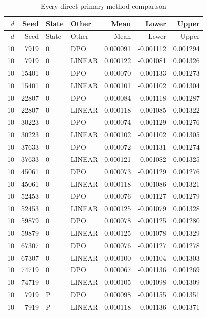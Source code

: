 \begingroup\small\setlength{\tabcolsep}{4pt}
\begin{longtable}{rrllrrr}
\caption{Every direct primary method comparison}\label{tab:r14pairedseeds}\\
\toprule
$d$ & Seed & State & Other & Mean & Lower & Upper\\\midrule
\endfirsthead
\toprule
$d$ & Seed & State & Other & Mean & Lower & Upper\\\midrule
\endhead
10 & 7919 & 0 & DPO & 0.000091 & -0.001112 & 0.001294\\
10 & 7919 & 0 & LINEAR & 0.000122 & -0.001081 & 0.001326\\
10 & 15401 & 0 & DPO & 0.000070 & -0.001133 & 0.001273\\
10 & 15401 & 0 & LINEAR & 0.000101 & -0.001102 & 0.001304\\
10 & 22807 & 0 & DPO & 0.000084 & -0.001118 & 0.001287\\
10 & 22807 & 0 & LINEAR & 0.000118 & -0.001085 & 0.001322\\
10 & 30223 & 0 & DPO & 0.000074 & -0.001129 & 0.001276\\
10 & 30223 & 0 & LINEAR & 0.000102 & -0.001102 & 0.001305\\
10 & 37633 & 0 & DPO & 0.000072 & -0.001131 & 0.001274\\
10 & 37633 & 0 & LINEAR & 0.000121 & -0.001082 & 0.001325\\
10 & 45061 & 0 & DPO & 0.000073 & -0.001129 & 0.001276\\
10 & 45061 & 0 & LINEAR & 0.000118 & -0.001086 & 0.001321\\
10 & 52453 & 0 & DPO & 0.000076 & -0.001127 & 0.001279\\
10 & 52453 & 0 & LINEAR & 0.000125 & -0.001079 & 0.001328\\
10 & 59879 & 0 & DPO & 0.000078 & -0.001125 & 0.001280\\
10 & 59879 & 0 & LINEAR & 0.000125 & -0.001078 & 0.001329\\
10 & 67307 & 0 & DPO & 0.000076 & -0.001127 & 0.001278\\
10 & 67307 & 0 & LINEAR & 0.000100 & -0.001104 & 0.001303\\
10 & 74719 & 0 & DPO & 0.000067 & -0.001136 & 0.001269\\
10 & 74719 & 0 & LINEAR & 0.000105 & -0.001098 & 0.001309\\
10 & 7919 & P & DPO & 0.000098 & -0.001155 & 0.001351\\
10 & 7919 & P & LINEAR & 0.000118 & -0.001136 & 0.001371\\

\end{longtable}
